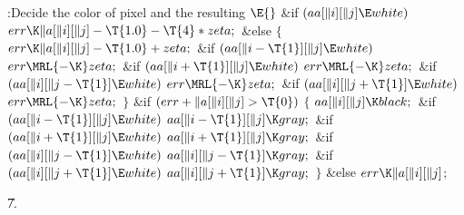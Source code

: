 \Y\B\4:Decide the color of pixel \PB{$[\|i,\|j]$} and the resulting \X${}\E{}$\6
\&{if} ${}(\\{aa}[\|i][\|j]\E\\{white}){}$\1\5
${}\\{err}\K\|a[\|i][\|j]-\T{1.0}-\T{4}*\\{zeta};{}$\2\6
\&{else}\5
${}\{{}$\1\6
${}\\{err}\K\|a[\|i][\|j]-\T{1.0}+\\{zeta};{}$\6
\&{if} ${}(\\{aa}[\|i-\T{1}][\|j]\E\\{white}){}$\1\5
${}\\{err}\MRL{-{\K}}\\{zeta};{}$\2\6
\&{if} ${}(\\{aa}[\|i+\T{1}][\|j]\E\\{white}){}$\1\5
${}\\{err}\MRL{-{\K}}\\{zeta};{}$\2\6
\&{if} ${}(\\{aa}[\|i][\|j-\T{1}]\E\\{white}){}$\1\5
${}\\{err}\MRL{-{\K}}\\{zeta};{}$\2\6
\&{if} ${}(\\{aa}[\|i][\|j+\T{1}]\E\\{white}){}$\1\5
${}\\{err}\MRL{-{\K}}\\{zeta};{}$\2\6
\4${}\}{}$\2\6
\&{if} ${}(\\{err}+\|a[\|i][\|j]>\T{0}){}$\5
${}\{{}$\1\6
${}\\{aa}[\|i][\|j]\K\\{black};{}$\6
\&{if} ${}(\\{aa}[\|i-\T{1}][\|j]\E\\{white}){}$\1\5
${}\\{aa}[\|i-\T{1}][\|j]\K\\{gray};{}$\2\6
\&{if} ${}(\\{aa}[\|i+\T{1}][\|j]\E\\{white}){}$\1\5
${}\\{aa}[\|i+\T{1}][\|j]\K\\{gray};{}$\2\6
\&{if} ${}(\\{aa}[\|i][\|j-\T{1}]\E\\{white}){}$\1\5
${}\\{aa}[\|i][\|j-\T{1}]\K\\{gray};{}$\2\6
\&{if} ${}(\\{aa}[\|i][\|j+\T{1}]\E\\{white}){}$\1\5
${}\\{aa}[\|i][\|j+\T{1}]\K\\{gray};{}$\2\6
\4${}\}{}$\2\6
\&{else}\1\5
${}\\{err}\K\|a[\|i][\|j]{}$;\2\par
\U7.\fi

